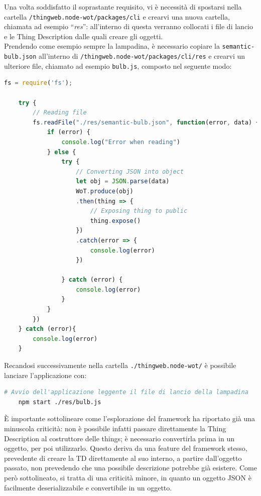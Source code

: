 \documentclass[12pt,a4paper,openright,oneside]{report}
\newcommand{\quotes}[1]{``#1''}
\begin{document}
Una volta soddisfatto il soprastante requisito, vi è necessità di spostarsi nella cartella \texttt{/thingweb.node-wot/packages/cli} e crearvi una nuova cartella, chiamata ad esempio \quotes{\textit{res}}: all'interno di questa verranno collocati i file di lancio e le Thing Description dalle quali creare gli oggetti.\\

Prendendo come esempio sempre la lampadina, è necessario copiare la \texttt{semantic-bulb.json} all'interno di \texttt{/thingweb.node-wot/packages/cli/res} e crearvi un ulteriore file, chiamato ad esempio \texttt{bulb.js}, composto nel seguente modo:
\begin{lstlisting}[language=JavaScript]
	fs = require('fs');
	
	try {
		// Reading file
		fs.readFile("./res/semantic-bulb.json", function(error, data) {
			if (error) {
				console.log("Error when reading")
			} else {
				try {
					// Converting JSON into object
					let obj = JSON.parse(data)
					WoT.produce(obj)
					.then(thing => {
						// Exposing thing to public
						thing.expose()
					})
					.catch(error => {
						console.log(error)
					})
					
				} catch (error) {
					console.log(error)
				}
			}
		})
	} catch (error){
		console.log(error)
	}
\end{lstlisting}

Recandosi successivamente nella cartella \texttt{./thingweb.node-wot/} è possibile lanciare l'applicazione con:

\begin{lstlisting}[language=bash]
	# Avvio dell'applicazione leggente il file di lancio della lampadina
	npm start ./res/bulb.js
\end{lstlisting}

È importante sottolineare come l'esplorazione del framework ha riportato già una minuscola criticità: non è possibile infatti passare direttamente la Thing Description al costruttore delle things; è necessario convertirla prima in un oggetto, per poi utilizzarlo. Questo deriva da una feature del framework stesso, prevedente di creare la TD direttamente al suo interno, a partire dall'oggetto passato, non prevedendo che una possibile descrizione potrebbe già esistere. Come però sottolineato, si tratta di una criticità minore, in quanto un oggetto JSON è facilmente deserializzabile e convertibile in un oggetto.\\
\end{document}
